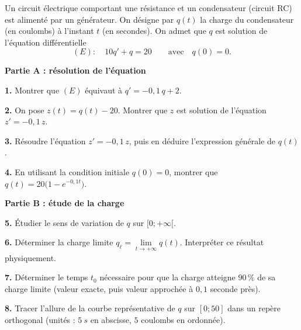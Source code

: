 \documentclass[11pt]{article}
\begin{document}
\begin{exercice}
Un circuit électrique comportant une résistance et un condensateur (circuit RC) est alimenté par un générateur. On désigne par $q(t)$ la charge du condensateur (en coulombs) à l'instant $t$ (en secondes). On admet que $q$ est solution de l'équation différentielle
\[ (E) : \quad 10q' + q = 20 \qquad \text{avec} \quad q(0) = 0. \]

\textbf{Partie A : résolution de l'équation}

\textbf{1.} Montrer que $(E)$ équivaut à $q' = -0{,}1\,q + 2$.

\textbf{2.} On pose $z(t) = q(t) - 20$. Montrer que $z$ est solution de l'équation $z' = -0{,}1\,z$.

\textbf{3.} Résoudre l'équation $z' = -0{,}1\,z$, puis en déduire l'expression générale de $q(t)$.

\textbf{4.} En utilisant la condition initiale $q(0) = 0$, montrer que $q(t) = 20\bigl(1 - e^{-0{,}1 t}\bigr)$.

\textbf{Partie B : étude de la charge}

\textbf{5.} Étudier le sens de variation de $q$ sur $[0 ; +\infty[$.

\textbf{6.} Déterminer la charge limite $q_{\ell} = \lim\limits_{t \to +\infty} q(t)$. Interpréter ce résultat physiquement.

\textbf{7.} Déterminer le temps $t_0$ nécessaire pour que la charge atteigne $90\,\%$ de sa charge limite (valeur exacte, puis valeur approchée à $0{,}1$ seconde près).

\textbf{8.} Tracer l'allure de la courbe représentative de $q$ sur $[0 ; 50]$ dans un repère orthogonal (unités : $\SI{5}{s}$ en abscisse, $5$ coulombs en ordonnée).
\end{exercice}
\end{document}
